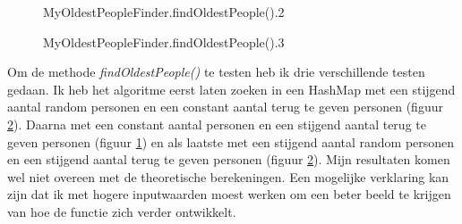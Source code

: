 \documentclass[10pt,a4paper]{report}
\begin{document}
\begin{figure}[h!]
    \centering
    \caption{MyOldestPeopleFinder.findOldestPeople().2}
    \label{fig:MOPF-fOP2}
\end{figure}
\begin{figure}[h!]
    \centering
    \caption{MyOldestPeopleFinder.findOldestPeople().3}
    \label{fig:MOPF-fOP3}
\end{figure}

Om de methode \textsl{findOldestPeople()} te testen heb ik drie verschillende testen gedaan. Ik heb het algoritme eerst laten zoeken in een HashMap met een stijgend aantal random personen en een constant aantal terug te geven personen (figuur \ref{fig:MOPF-fOP3}). Daarna met een constant aantal personen en een stijgend aantal terug te geven personen (figuur \ref{fig:MOPF-fOP2}) en als laatste met een stijgend aantal random personen en een stijgend aantal terug te geven personen (figuur \ref{fig:MOPF-fOP3}). Mijn resultaten komen wel niet overeen met de theoretische berekeningen. Een mogelijke verklaring kan zijn dat ik met hogere inputwaarden moest werken om een beter beeld te krijgen van hoe de functie zich verder ontwikkelt.
\end{document}
